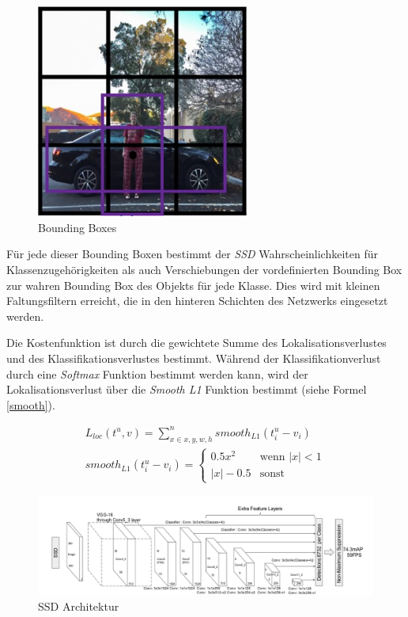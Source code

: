 \begin{figure}[ht]
	\begin{center}
		\includegraphics[width=7cm]{Bilder/bounding_boxes.png} 
		\caption[Bounding Boxes]{Bounding Boxes \cite{AndrewNg.2019}}
		\label{boundingboxes}
	\end{center}
\end{figure}

Für jede dieser Bounding Boxen bestimmt der \textit{SSD} Wahrscheinlichkeiten für Klassenzugehörigkeiten als auch Verschiebungen der vordefinierten Bounding Box zur wahren Bounding Box des Objekts für jede Klasse. Dies wird mit kleinen Faltungsfiltern erreicht, die in den hinteren Schichten des Netzwerks eingesetzt werden. \cite[S. 3]{ssd.20161229}

Die Kostenfunktion ist durch die gewichtete Summe des Lokalisationsverlustes und des Klassifikationsverlustes bestimmt. Während der Klassifikationverlust durch eine \textit{Softmax} Funktion bestimmt werden kann, wird der Lokalisationsverlust über die \textit{Smooth L1} Funktion bestimmt (siehe Formel \ref{smooth}). \cite[S. 3]{ssd.20161229}

\begin{equation}\label{smooth}
\begin{split}
L_{loc}(t^u,v) = \sum\limits_{x \in {x,y,w,h}}^{n} smooth_{L1}(t^u_i - v_i) \\
smooth_{L1}(t^u_i - v_i) = \begin{cases}
							0.5x^2      & \text{wenn } |x| < 1\\
							|x| - 0.5   & \text{sonst}
						   \end{cases}
\end{split}
\end{equation}

\begin{figure}[ht]
	\begin{center}
		\includegraphics[width=15cm]{Bilder/ssd_architecture.png} 
		\caption[SSD Architektur]{SSD Architektur \cite[S. 4]{ssd.20161229}}
		\label{architecture}
	\end{center}
\end{figure}

